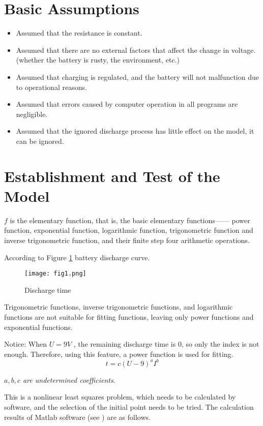 \documentclass[conference]{IEEEtran}
\begin{document}
\section{Basic Assumptions}
\begin{itemize}
\item  Assumed that the resistance is constant.
\item Assumed that there are no external factors that affect the change in voltage. (whether the battery is rusty, the environment, etc.)
\item Assumed that charging is regulated, and the battery will not malfunction due to operational reasons.
\item Assumed that errors caused by computer operation in all programs are negligible.
\item Assumed that the ignored discharge process has little effect on the model, it can be ignored.

\end{itemize}

\section{Establishment and Test of the Model}
$f$ is the elementary function, that is, the basic elementary functions—— power function, exponential function, logarithmic function, trigonometric function and inverse trigonometric function, and their finite step four arithmetic operations. 

According to Figure \ref{fig1} battery discharge curve.

\begin{figure}[htbp]
	\centerline{\texttt{[image: fig1.png]}}
	\caption{Discharge time}
	\label{fig1}
\end{figure}

Trigonometric functions, inverse trigonometric functions, and logarithmic functions are not suitable for fitting functions, leaving only power functions and exponential functions.

Notice: When $U=9V$ , the remaining discharge time is 0, so only the index is not enough. Therefore, using this feature, a power function is used for fitting. 
\begin{equation}
t = c{\left( {U - 9} \right)^a}{I^b} \label{eq1}
\end{equation}

\emph{$a,b,c$ are undetermined coefficients.}
 
This is a nonlinear least squares problem, which needs to be calculated by software, and the selection of the initial point needs to be tried. The calculation results of Matlab software (see \cite{b1}) are as follows.
\end{document}
